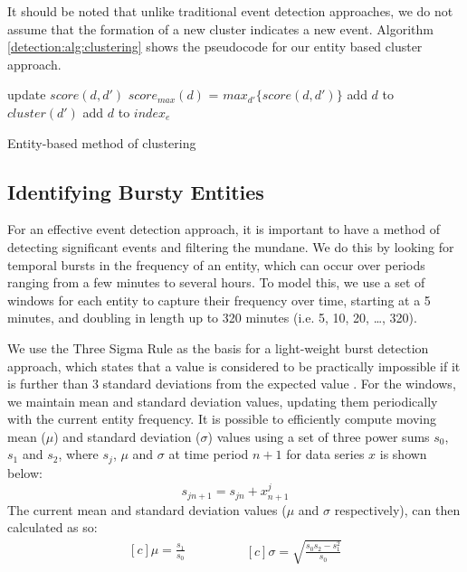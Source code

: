 It should be noted that unlike traditional event detection approaches, we do not assume that the formation of a new cluster indicates a new event. Algorithm \ref{detection:alg:clustering} shows the pseudocode for our entity based cluster approach.

\begin{algorithm}
 {
	 {
		 {
			 {
				update $score(d, d')$\;
			}
		}
		$score_{max}(d)$ = $max_{d'}\{score(d, d')\}$\;
		 {
			add $d$ to $cluster(d')$\;
		}
		add $d$ to $index_{e}$\;
	}
}
\caption{Entity-based method of clustering}
\label{detection:alg:clustering}
\end{algorithm}

\subsection{Identifying Bursty Entities}
For an effective event detection approach, it is important to have a method of detecting significant events and filtering the mundane. We do this by looking for temporal bursts in the frequency of an entity, which can occur over periods ranging from a few minutes to several hours. To model this, we use a set of windows for each entity to capture their frequency over time, starting at a 5 minutes, and doubling in length up to 320 minutes (i.e. 5, 10, 20, \ldots, 320).

We use the Three Sigma Rule as the basis for a light-weight burst detection approach, which states that a value is considered to be practically impossible if it is further than 3 standard deviations from the expected value \citep{Pukelsheim94}. For the windows, we maintain mean and standard deviation values, updating them periodically with the current entity frequency. It is possible to efficiently compute moving mean (\(\mu\)) and standard deviation (\(\sigma\)) values using a set of three power sums \(s_0\), \(s_1\) and \(s_2\), where \(s_j\), \(\mu\) and \(\sigma\) at time period \(n+1\) for data series \(x\) is shown below:
\[
s_{jn+1}= s_{jn} + x_{n+1}^j
\]
The current mean and standard deviation values (\(\mu\) and \(\sigma\) respectively), can then calculated as so:
\begin{equation*}
	\begin{aligned}[c]
		\mu = \frac{s_1}{s_0}
	\end{aligned}
	\qquad\qquad
	\begin{aligned}[c]
		\sigma = \sqrt{\frac{s_0 s_2 - s_1^2}{s_0}}
	\end{aligned}
\end{equation*}

